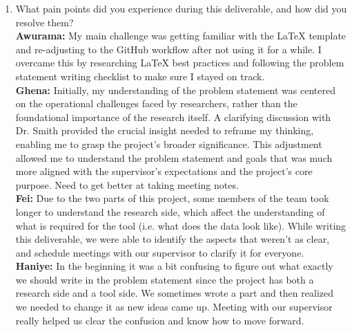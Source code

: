 \documentclass{article}
\begin{document}
\begin{enumerate}
    \item What pain points did you experience during this deliverable, and how
    did you resolve them? \\
    \textbf{Awurama:} My main challenge was getting familiar with the LaTeX template and re-adjusting to the GitHub workflow after not using it for a while. I overcame this by researching LaTeX best practices and following the problem statement writing checklist to make sure I stayed on track.  
    \\\textbf{Ghena:} Initially, my understanding of the problem statement was centered on the operational challenges faced by researchers, rather than the foundational importance of the research itself. A clarifying discussion with Dr. Smith provided the crucial insight needed to reframe my thinking, enabling me to grasp the project's broader significance. This adjustment allowed me to understand the problem statement and goals that was much more aligned with the supervisor's expectations and the project's core purpose. Need to get better at taking meeting notes.
    \\\textbf{Fei:} Due to the two parts of this project, some members of the team took longer to understand the research side, which affect the understanding of what is required for the tool (i.e. what does the data look like). While writing this deliverable, we were able to identify the aspects that weren’t as clear, and schedule meetings with our supervisor to clarify it for everyone. 
    \\\textbf{Haniye:} In the beginning it was a bit confusing to figure out what exactly we should write in the problem statement since the project has both a research side and a tool side. We sometimes wrote a part and then realized we needed to change it as new ideas came up. Meeting with our supervisor really helped us clear the confusion and know how to move forward.


\end{enumerate}
\end{document}

